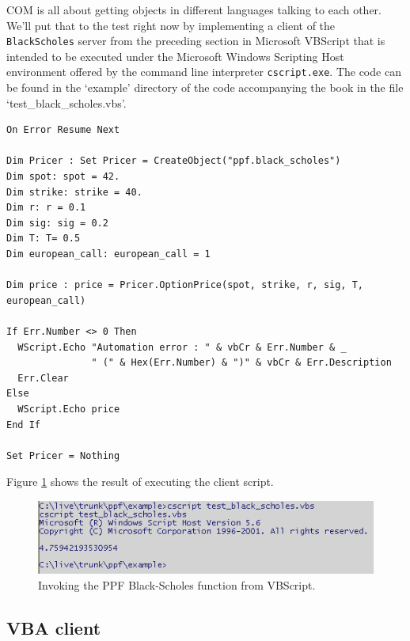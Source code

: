 COM is all about getting objects in different languages talking to
each other. We'll put that to the test right now by implementing a
client of the \verb|BlackScholes| server from the preceding section
in Microsoft VBScript that is intended to be executed under the
Microsoft Windows Scripting Host environment offered by the command
line interpreter \verb|cscript.exe|. The code can be found in the
`example' directory of the code accompanying the book in the file
`test\_black\_scholes.vbs'.
\begin{verbatim}
On Error Resume Next

Dim Pricer : Set Pricer = CreateObject("ppf.black_scholes")
Dim spot: spot = 42.
Dim strike: strike = 40.
Dim r: r = 0.1
Dim sig: sig = 0.2
Dim T: T= 0.5
Dim european_call: european_call = 1

Dim price : price = Pricer.OptionPrice(spot, strike, r, sig, T, european_call)

If Err.Number <> 0 Then
  WScript.Echo "Automation error : " & vbCr & Err.Number & _
               " (" & Hex(Err.Number) & ")" & vbCr & Err.Description
  Err.Clear
Else
  WScript.Echo price
End If

Set Pricer = Nothing
\end{verbatim}
Figure \ref{fig:invoke-black-scholes-from-vbs} shows the result of
executing the client script.
\begin{figure}
\centering
\includegraphics[scale=0.5]{img/black_scholes_vbs_client.PNG}
\caption{Invoking the PPF Black-Scholes function from VBScript.}
\label{fig:invoke-black-scholes-from-vbs}
\end{figure}

\subsection{VBA client}

